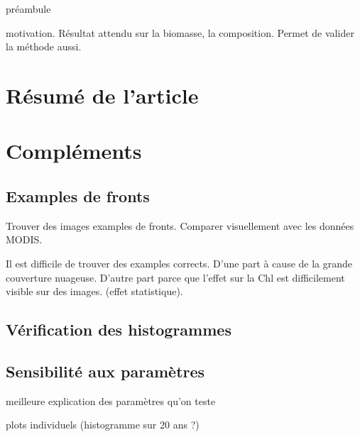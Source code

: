 
\label{chp:res-chl}
\graphicspath{{resources/res_chl}}

\minitoc%
\clearpage

préambule

motivation.
Résultat attendu sur la biomasse, la composition.
Permet de valider la méthode aussi.

\section{Résumé de l'article}
\label{sec:resume-article}

\insertArticle{}

\section{Compléments}
\label{sec:complements-chl}

\subsection{Examples de fronts}
\label{sec:examples-fronts}

Trouver des images examples de fronts.
Comparer visuellement avec les données MODIS\@.

Il est difficile de trouver des examples corrects.
D'une part à cause de la grande couverture nuageuse.
D'autre part parce que l'effet sur la Chl est difficilement visible sur des images. (effet statistique).

\subsection{Vérification des histogrammes}

\subsection{Sensibilité aux paramètres}
\label{sec:sensibilite-parametres}

meilleure explication des paramètres qu'on teste

plots individuels (histogramme sur 20 ans ?)


